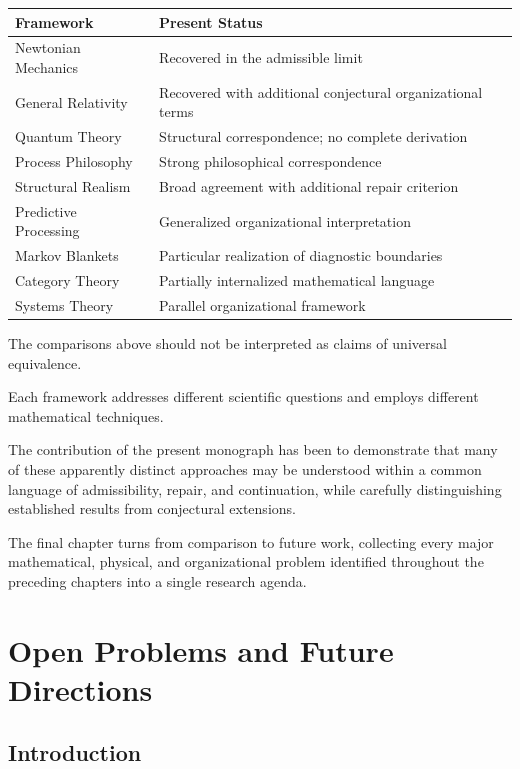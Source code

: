 \documentclass[11pt,oneside]{book}
\numberwithin{equation}{chapter}
\theoremstyle{definition}
\theoremstyle{plain}
\begin{document}
\begin{center}
\begin{tabular}{p{5cm}p{7cm}}
\toprule
Framework & Present Status \\
\midrule
Newtonian Mechanics & Recovered in the admissible limit \\
General Relativity & Recovered with additional conjectural organizational
terms \\
Quantum Theory & Structural correspondence; no complete derivation \\
Process Philosophy & Strong philosophical correspondence \\
Structural Realism & Broad agreement with additional repair criterion \\
Predictive Processing & Generalized organizational interpretation \\
Markov Blankets & Particular realization of diagnostic boundaries \\
Category Theory & Partially internalized mathematical language \\
Systems Theory & Parallel organizational framework \\
\bottomrule
\end{tabular}
\end{center}

The comparisons above should not be interpreted as claims of universal
equivalence.

Each framework addresses different scientific questions and employs
different mathematical techniques.

The contribution of the present monograph has been to demonstrate that many
of these apparently distinct approaches may be understood within a common
language of admissibility, repair, and continuation, while carefully
distinguishing established results from conjectural extensions.

The final chapter turns from comparison to future work, collecting every
major mathematical, physical, and organizational problem identified
throughout the preceding chapters into a single research agenda.

\chapter{Open Problems and Future Directions}

\section{Introduction}
\end{document}

